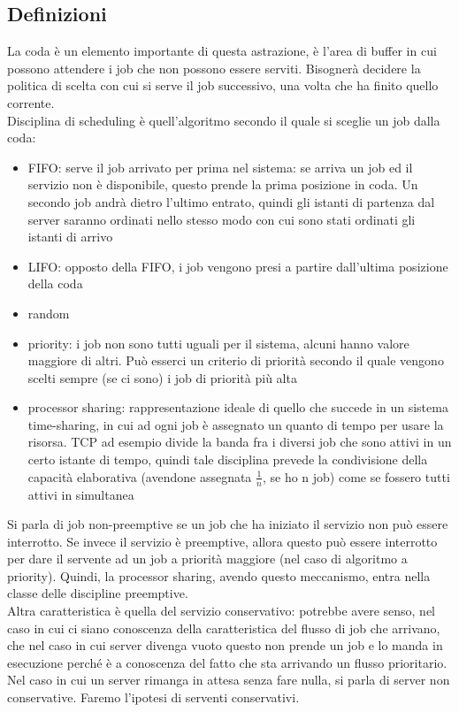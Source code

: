 \documentclass{article}
\begin{document}
\subsection{Definizioni}
La coda è un elemento importante di questa astrazione, è l'area di buffer in cui possono attendere i job che non possono essere serviti. Bisognerà decidere la politica di scelta con cui si serve il job successivo, una volta che ha finito quello corrente.\\ Disciplina di scheduling è quell'algoritmo secondo il quale si sceglie un job dalla coda:
\begin{itemize}
\item FIFO: serve il job arrivato per prima nel sistema: se arriva un job ed il servizio non è disponibile, questo prende la prima posizione in coda. Un secondo job andrà dietro l'ultimo entrato, quindi gli istanti di partenza dal server saranno ordinati nello stesso modo con cui sono stati ordinati gli istanti di arrivo
\item LIFO: opposto della FIFO, i job vengono presi a partire dall'ultima posizione della coda
\item random
\item priority: i job non sono tutti uguali per il sistema, alcuni hanno valore maggiore di altri. Può esserci un criterio di priorità secondo il quale vengono scelti sempre (se ci sono) i job di priorità più alta
\item processor sharing: rappresentazione ideale di quello che succede in un sistema time-sharing, in cui ad ogni job è assegnato un quanto di tempo per usare la risorsa. TCP ad esempio divide la banda fra i diversi job che sono attivi in un certo istante di tempo, quindi tale disciplina prevede la condivisione della capacità elaborativa (avendone assegnata $\frac{1}{n}$, se ho n job) come se fossero tutti attivi in simultanea
\end{itemize}
Si parla di job non-preemptive se un job che ha iniziato il servizio non può essere interrotto. Se invece il servizio è preemptive, allora questo può essere interrotto per dare il servente ad un job a priorità maggiore (nel caso di algoritmo a priority). Quindi, la processor sharing, avendo questo meccanismo, entra nella classe delle discipline preemptive.\\ Altra caratteristica è quella del servizio conservativo: potrebbe avere senso, nel caso in cui ci siano conoscenza della caratteristica del flusso di job che arrivano, che nel caso in cui server divenga vuoto questo non prende un job e lo manda in esecuzione perché è a conoscenza del fatto che sta arrivando un flusso prioritario.\\ Nel caso in cui un server rimanga in attesa senza fare nulla, si parla di server non conservative. Faremo l'ipotesi di serventi conservativi.
\end{document}
